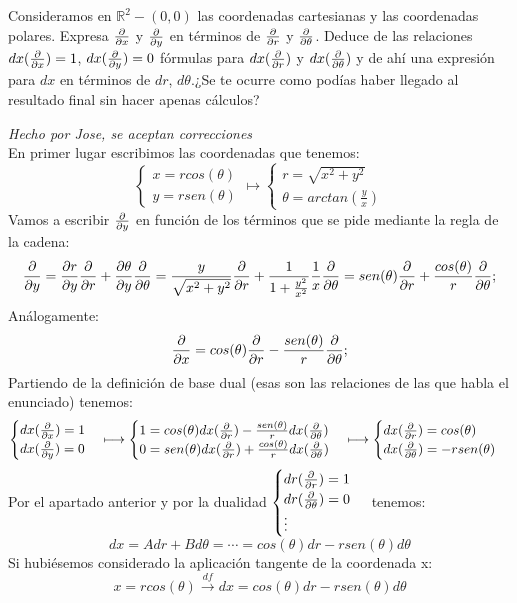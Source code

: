\begin{problem}[14] Consideramos en $ℝ^2-{(0,0)}$ las coordenadas cartesianas y las coordenadas polares. \ppart Expresa $\pdv{x}$ y $\pdv{y}$ en términos de $\pdv{r}$ y $\pdv{\theta}$. \ppart Deduce de las relaciones $dx(\pdv{x})=1$, $dx(\pdv{y})=0$ fórmulas para $dx(\pdv{r})$ y $dx(\pdv{\theta})$ \ppart y de ahí una expresión para $dx$ en términos de $dr$, $d\theta$.\ppart¿Se te ocurre como podías haber llegado al resultado final sin hacer apenas cálculos?
	
	\solution\textit{Hecho por Jose, se aceptan correcciones}\\ En primer lugar escribimos las coordenadas que tenemos:
	$$\begin{cases}x=rcos(\theta)\\y=rsen(\theta)\end{cases}\longmapsto\begin{cases}r=\sqrt{x^2+y^2}\\\theta=arctan(\frac{y}{x})\end{cases}$$
	\spart Vamos a escribir $\pdv{y}$ en función de los términos que se pide mediante la regla de la cadena:
	$$\pdv{y}=\pdv{r}{y}\pdv{r}+\pdv{\theta}{y}\pdv{\theta}=\frac{y}{\sqrt{x^2+y^2}}\pdv{r}+\frac{1}{1+\frac{y^2}{x^2}}\frac{1}{x}\pdv{\theta}=sen(\theta)\pdv{r}+\frac{cos(\theta)}{r}\pdv{\theta};$$
	Análogamente:
	$$\pdv{x}=cos(\theta)\pdv{r}-\frac{sen(\theta)}{r}\pdv{\theta};$$
	\spart Partiendo de la definición de base dual (esas son las relaciones de las que habla el enunciado) tenemos:
	$$\begin{cases}dx(\pdv{x})=1\\dx(\pdv{y})=0\end{cases}\longmapsto\begin{cases}1=cos(\theta)dx(\pdv{r})-\frac{sen(\theta)}{r}dx(\pdv{\theta})\\0=sen(\theta)dx(\pdv{r})+\frac{cos(\theta)}{r}dx(\pdv{\theta})\end{cases}\longmapsto\begin{cases}dx(\pdv{r})=cos(\theta)\\dx(\pdv{\theta})=-rsen(\theta)\end{cases}$$
	\spart Por el apartado anterior y por la dualidad $\begin{cases}dr(\pdv{r})=1\\dr(\pdv{\theta})=0\\\vdots\end{cases}$ tenemos: $$dx=Adr+Bd\theta=\cdots=cos(\theta)dr-rsen(\theta)d\theta$$
	\spart Si hubiésemos considerado la aplicación tangente de la coordenada x:
	$$x=rcos(\theta)\xrightarrow{df}dx=cos(\theta)dr-rsen(\theta)d\theta$$
\end{problem}
